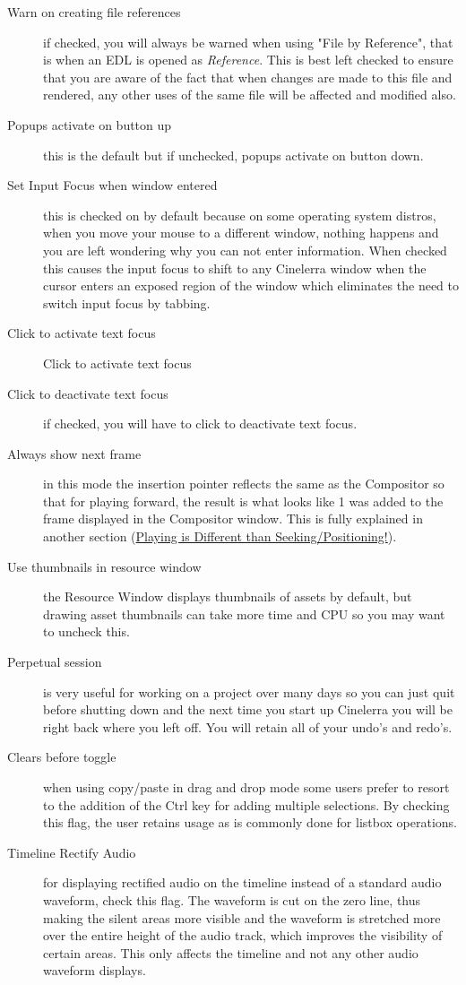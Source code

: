 \begin{description}
    \item[Warn on creating file references] if checked, you will always be warned when using "File by 
Reference", that is when an EDL is opened as \textit{Reference}.  This is best left checked to ensure that you are aware of the fact that when changes are made
to this file and rendered, any other uses of the same file will be affected and modified also.
    \item[Popups activate on button up] this is the default but if unchecked, popups activate on button down.
    \item[Set Input Focus when window entered] this is checked on by default because on some operating system distros, when you move your mouse to a different window, nothing happens and you are left wondering why you can not enter information.  When checked this causes the input focus to shift to any Cinelerra window when the cursor enters an exposed region of the window which eliminates the need to switch input focus by tabbing. 
    \item[Click to activate text focus] Click to activate text focus
    \item [Click to deactivate text focus] if checked, you will have to click to deactivate text focus.
    \item[Always show next frame] in this mode the insertion pointer reflects the same as the Compositor so that for playing forward, the result is what looks like 1 was added to the frame displayed in the Compositor window.  This is fully explained in another section (\hyperref[sub:playing_seeking]{Playing is Different than Seeking/Positioning!}).
    \item[Use thumbnails in resource window] the Resource Window displays thumbnails of assets by default, but drawing asset thumbnails can take more time and CPU so you may want to uncheck this.
    \item[Perpetual session] is very useful for working on a project over many days so you can just quit before
    shutting down and the next time you start up Cinelerra you will be right back where you left off. You
    will retain all of your undo's and redo's.
    \item[Clears before toggle] when using copy/paste in drag and drop mode some users prefer to resort to the addition of the Ctrl key for adding multiple selections.  By checking this flag, the user retains usage as is commonly done for listbox operations.
    \item[Timeline Rectify Audio] for displaying rectified audio on the timeline instead of a standard audio waveform, check this flag.  The waveform is cut on the zero line, thus making the silent areas more visible and the waveform is stretched more over the entire height of the audio track, which improves the visibility of certain areas. This only affects the timeline and not any other audio waveform displays.
\end{description}

